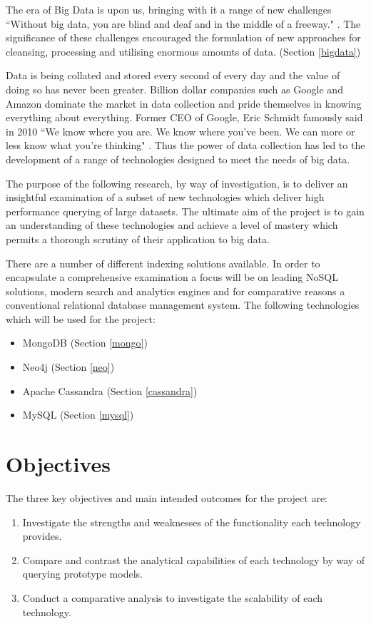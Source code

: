 The era of Big Data is upon us, bringing with it a range of new challenges ``Without big data, you are blind and deaf and in the middle of a freeway."\cite{moore} . The significance of these challenges encouraged the formulation of new approaches for cleansing, processing and utilising enormous amounts of data. (Section \ref{bigdata})

Data is being collated and stored every second of every day and the value of doing so has never been greater. Billion dollar companies such as Google and Amazon dominate the market in data collection and pride themselves in knowing everything about everything. Former CEO of Google, Eric Schmidt famously said in 2010 ``We know where you are. We know where you've been. We can more or less know what you're thinking" \cite{schmidt}. Thus the power of data collection has led to the development of a range of technologies designed to meet the needs of big data.

The purpose of the following research, by way of investigation, is to deliver an insightful examination of a subset of new technologies which deliver high performance querying of large datasets. The ultimate aim of the project is to gain an understanding of these technologies and achieve a level of mastery which permits a thorough scrutiny of their application to big data.

There are a number of different indexing solutions available. In order to encapsulate a comprehensive examination a focus will be on leading NoSQL solutions, modern search and analytics engines and for comparative reasons a conventional relational database management system. The following technologies which will be used for the project: 

\begin{itemize}
\item MongoDB (Section \ref{mongo})
\item Neo4j (Section \ref{neo})
\item Apache Cassandra (Section \ref{cassandra})
\item MySQL (Section \ref{mysql})
\end{itemize}

\section{Objectives}\label{objectives}
The three key objectives and main intended outcomes for the project are:
\begin{enumerate}
\item Investigate the strengths and weaknesses of the functionality each technology provides.
\item Compare and contrast the analytical capabilities of each technology by way of querying prototype models.
\item Conduct a comparative analysis to investigate the scalability of each technology.
\end{enumerate}

